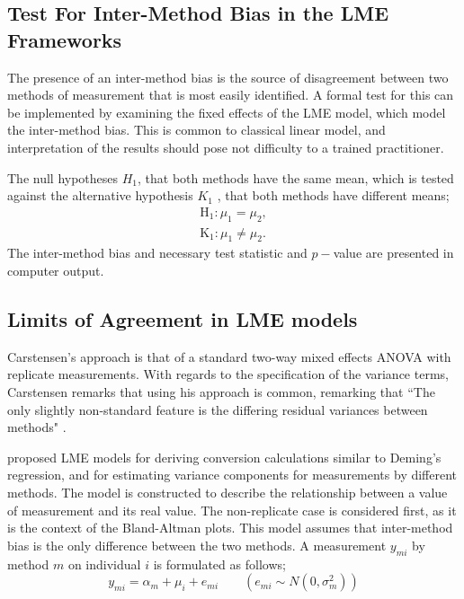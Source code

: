 \documentclass[12pt, a4paper]{report}
\theoremstyle{plain}
\theoremstyle{definition}
\theoremstyle{remark}
\begin{document}
	
	
	
	
	\subsection{Test For Inter-Method Bias in the LME Frameworks}
	The presence of an inter-method bias is the source of disagreement between two methods of measurement that is most easily identified. A formal test for this can be implemented by examining the fixed effects of the LME model, which model the inter-method bias. This is common to classical linear model, and interpretation of the results should pose not difficulty to a trained practitioner.
	
	The null hypotheses $H_1$, that both methods have the same mean, which is tested against the alternative hypothesis $K_1$ , that both methods have different means;
	\begin{eqnarray}
	\operatorname{H_1} : \mu_1 = \mu_2 ,\\
	\operatorname{K_1} : \mu_1 \neq \mu_2.
	\end{eqnarray}
	The inter-method bias and necessary test statistic and $p-$value are presented in computer output. 
	
	\subsection{Limits of Agreement in LME models}
	
	Carstensen's approach is that of a standard two-way mixed effects ANOVA with replicate measurements. With regards to the specification of the variance terms, Carstensen remarks that using his approach is common, remarking that ``The only slightly non-standard feature is the differing residual variances between methods" \citep{BXC2010}.
	
	\citet{BXC2004} proposed LME models for deriving conversion calculations similar to Deming's regression, and for
	estimating variance components for measurements by different methods. The model is constructed to
	describe the relationship between a value of measurement and its real value. The non-replicate case is considered first, as it is
	the context of the Bland-Altman plots. This model assumes that inter-method bias is the only difference between the two methods.
	A measurement $y_{mi}$ by method $m$ on individual $i$ is formulated as follows;
	\begin{equation}
	y_{mi}  = \alpha_{m} + \mu_{i} + e_{mi} \qquad ( e_{mi} \sim
	N(0,\sigma^{2}_{m}))
	\end{equation}
	
\end{document}
